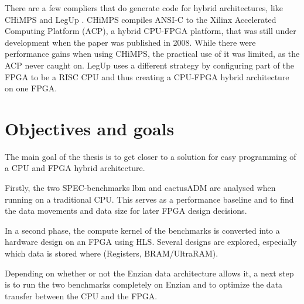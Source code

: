 \documentclass[12pt]{article}
\begin{document}
There are a few compliers that do generate code for hybrid architectures, like CHiMPS \cite{CHiMPS} and LegUp \cite{LegUp}. CHiMPS \cite{CHiMPS} compiles ANSI-C to the Xilinx Accelerated Computing Platform (ACP), a hybrid CPU-FPGA platform, that was still under development when the paper was published in 2008. While there were performance gains when using CHiMPS, the practical use of it was limited, as the ACP never caught on. LegUp uses a different strategy by configuring part of the FPGA to be a RISC CPU and thus creating a CPU-FPGA hybrid architecture on one FPGA.
\section*{Objectives and goals}
The main goal of the thesis is to get closer to a solution for easy programming of a CPU and FPGA hybrid architecture.

Firstly, the two SPEC-benchmarks lbm \cite{SPEC_lbm} and cactusADM \cite{SPEC_cactusADM} are analysed when running on a traditional CPU. This serves as a performance baseline and to find the data movements and data size for later FPGA design decisions.

In a second phase, the compute kernel of the benchmarks is converted into a hardware design on an FPGA using HLS. Several designs are explored, especially which data is stored where (Registers, BRAM/UltraRAM).

Depending on whether or not the Enzian data architecture allows it, a next step is to run the two benchmarks completely on Enzian and to optimize the data transfer between the CPU and the FPGA.
\end{document}

